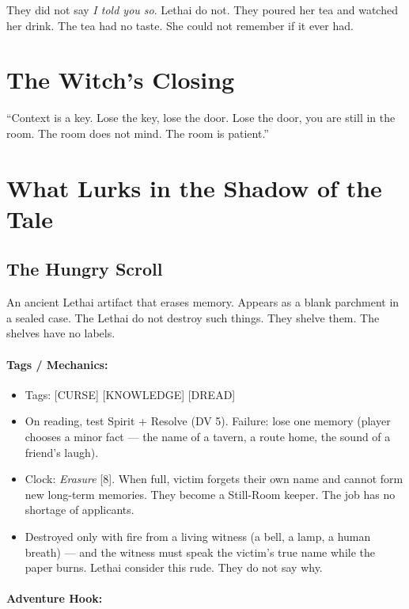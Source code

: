 They did not say \emph{I told you so}. Lethai do not. They poured her tea and watched her drink. The tea had no taste. She could not remember if it ever had.

\section*{The Witch's Closing}

``Context is a key. Lose the key, lose the door. Lose the door, you are still in the room. The room does not mind. The room is patient.''

\section*{What Lurks in the Shadow of the Tale}

\subsection*{The Hungry Scroll}

An ancient Lethai artifact that erases memory. Appears as a blank parchment in a sealed case. The Lethai do not destroy such things. They shelve them. The shelves have no labels.

\paragraph{Tags / Mechanics:}

\begin{itemize}
\item Tags: [CURSE] [KNOWLEDGE] [DREAD]
\item On reading, test Spirit + Resolve (DV 5). Failure: lose one memory (player chooses a minor fact --- the name of a tavern, a route home, the sound of a friend's laugh).
\item Clock: \textit{Erasure} [8]. When full, victim forgets their own name and cannot form new long-term memories. They become a Still-Room keeper. The job has no shortage of applicants.
\item Destroyed only with fire from a living witness (a bell, a lamp, a human breath) --- and the witness must speak the victim's true name while the paper burns. Lethai consider this rude. They do not say why.
\end{itemize}

\paragraph{Adventure Hook:}

